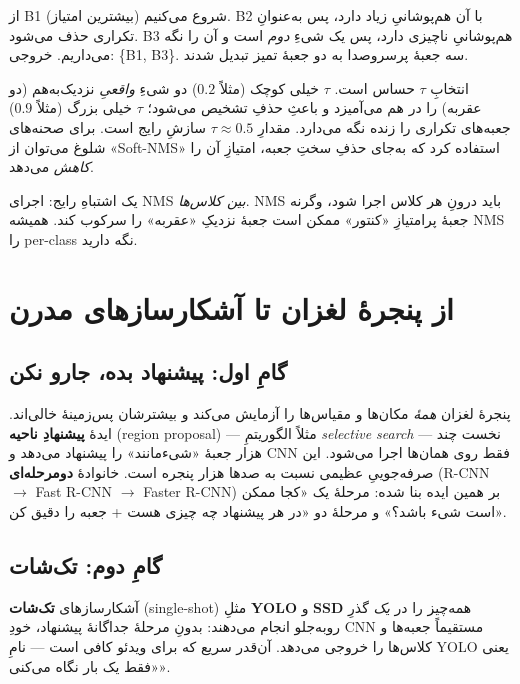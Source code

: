 \documentclass[12pt,a4paper]{article}
\begin{document}
از B1 (بیشترین امتیاز) شروع می‌کنیم. B2 با آن هم‌پوشانیِ زیاد دارد، پس به‌عنوانِ تکراری حذف می‌شود. B3 هم‌پوشانیِ ناچیزی دارد، پس یک شیءِ \emph{دوم} است و آن را نگه می‌داریم. خروجی: \{B1, B3\}. سه جعبهٔ پرسروصدا به دو جعبهٔ تمیز تبدیل شدند.

\begin{hoshdar}
انتخابِ $\tau$ حساس است. $\tau$ خیلی کوچک (مثلاً $0.2$) دو شیءِ \emph{واقعیِ} نزدیک‌به‌هم (دو عقربه) را در هم می‌آمیزد و باعثِ حذفِ تشخیص می‌شود؛ $\tau$ خیلی بزرگ (مثلاً $0.9$) جعبه‌های تکراری را زنده نگه می‌دارد. مقدارِ $\tau\approx0.5$ سازشِ رایج است. برای صحنه‌های شلوغ می‌توان از «Soft-NMS» استفاده کرد که به‌جای حذفِ سختِ جعبه، امتیازِ آن را \emph{کاهش} می‌دهد.
\end{hoshdar}

\begin{yaddasht}
یک اشتباهِ رایج: اجرای NMS \emph{بین کلاس‌ها}. NMS باید درونِ هر کلاس اجرا شود، وگرنه جعبهٔ پرامتیازِ «کنتور» ممکن است جعبهٔ نزدیکِ «عقربه» را سرکوب کند. همیشه NMS را per-class نگه دارید.
\end{yaddasht}

\section{از پنجرهٔ لغزان تا آشکارسازهای مدرن}

\subsection{گامِ اول: پیشنهاد بده، جارو نکن}

پنجرهٔ لغزان \emph{همهٔ} مکان‌ها و مقیاس‌ها را آزمایش می‌کند و بیشترشان پس‌زمینهٔ خالی‌اند. ایدهٔ \textbf{پیشنهادِ ناحیه} (region proposal) — مثلاً الگوریتمِ \emph{selective search} — نخست چند هزار جعبهٔ «شیء‌مانند» را پیشنهاد می‌دهد و CNN فقط روی همان‌ها اجرا می‌شود. این صرفه‌جوییِ عظیمی نسبت به صدها هزار پنجره است. خانوادهٔ \textbf{دومرحله‌ای} (R-CNN $\to$ Fast R-CNN $\to$ Faster R-CNN) بر همین ایده بنا شده: مرحلهٔ یک «کجا ممکن است شیء باشد؟» و مرحلهٔ دو «در هر پیشنهاد چه چیزی هست + جعبه را دقیق کن».

\subsection{گامِ دوم: تک‌شات}

آشکارسازهای \textbf{تک‌شات} (single-shot) مثلِ \textbf{YOLO} و \textbf{SSD} همه‌چیز را در \emph{یک} گذرِ رو‌به‌جلو انجام می‌دهند: بدونِ مرحلهٔ جداگانهٔ پیشنهاد، خودِ CNN مستقیماً جعبه‌ها و کلاس‌ها را خروجی می‌دهد. آن‌قدر سریع که برای ویدئو کافی است — نامِ YOLO یعنی «فقط یک بار نگاه می‌کنی».
\end{document}
